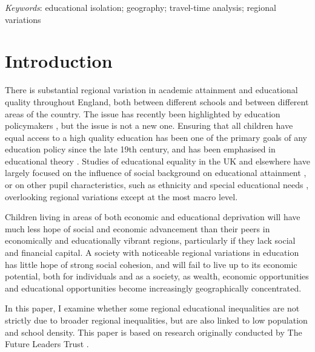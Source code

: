 \documentclass[12pt, a4paper]{article}
\begin{document}
\emph{Keywords}: educational isolation; geography; travel-time analysis; regional variations
	
\section{Introduction}

There is substantial regional variation in academic attainment and educational quality throughout England, both between different schools and between different areas of the country. The issue has recently been highlighted by education policymakers \autocites[for example see][]{departmentforeducation2016b,departmentforeducation2016c, wilshaw2015}, but the issue is not a new one. Ensuring that all children have equal access to a high quality education has been one of the primary goals of any education policy since the late 19th century, and has been emphasised in educational theory \autocites[for example see][]{coleman1968, dewey1916}. Studies of educational equality in the UK and elsewhere have largely focused on the influence of social background on educational attainment \autocites[see][]{breen2005}, or on other pupil characteristics, such as ethnicity and special educational needs \autocites[for example see][]{perera2016, strand2015a}, overlooking regional variations except at the most macro level. 

Children living in areas of both economic and educational deprivation will have much less hope of social and economic advancement than their peers in economically and educationally vibrant regions, particularly if they lack social and financial capital. A society with noticeable regional variations in education has little hope of strong social cohesion, and will fail to live up to its economic potential, both for individuals and as a society, as wealth, economic opportunities and educational opportunities become increasingly geographically concentrated.

In this paper, I examine whether some regional educational inequalities are not strictly due to broader regional inequalities, but are also linked to low population and school density. This paper is based on research originally conducted by The Future Leaders Trust \autocites{theobald2015}.
\end{document}
